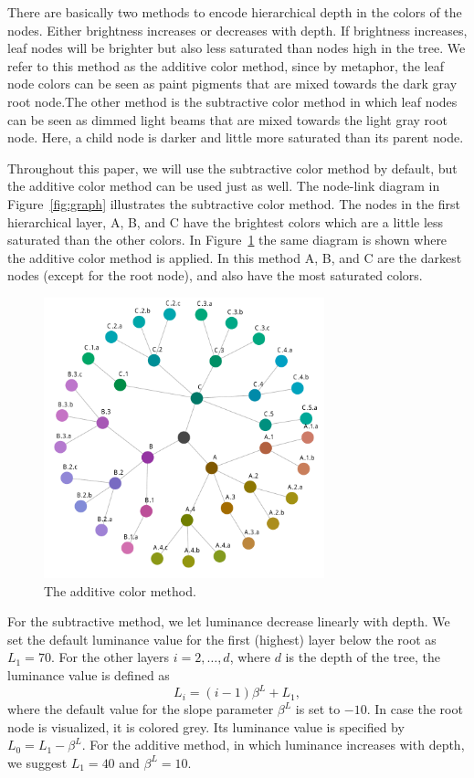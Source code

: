 \documentclass[review,journal]{vgtc}         %
\begin{document}
There are basically two methods to encode hierarchical depth in the colors of the nodes. Either brightness increases or decreases with depth. If brightness increases, leaf nodes will be brighter but also less saturated than nodes high in the tree. We refer to this method as the additive color method, since by metaphor, the leaf node colors can be seen as paint pigments that are mixed towards the dark gray root node.The other method is the subtractive color method in which leaf nodes can be seen as dimmed light beams that are mixed towards the light gray root node. Here, a child node is darker and little more saturated than its parent node.

Throughout this paper, we will use the subtractive color method by default, but the additive color method can be used just as well. The node-link diagram in Figure~\ref{fig:graph} illustrates the subtractive color method. The nodes in the first hierarchical layer, A, B, and C have the brightest colors which are a little less saturated than the other colors. In Figure~\ref{fig:graphadd} the same diagram is shown where the additive color method is applied. In this method A, B, and C are the darkest nodes (except for the root node), and also have the most saturated colors.

\begin{figure}[tb]
  \centering
  \includegraphics[width=3.2in]{HCPgraph3.pdf}
  \caption{The additive color method.}\label{fig:graphadd}
\end{figure}


For the subtractive method, we let luminance decrease linearly with depth. We set the default luminance value for the first (highest) layer below the root as $L_1=70$. For the other layers $i=2,\ldots, d$, where $d$ is the depth of the tree, the luminance value is defined as
\begin{equation}
L_i=(i-1)\beta^L + L_1,
\end{equation}
where the default value for the slope parameter $\beta^L$ is set to $-10$. In case the root node is visualized, it is colored grey. Its luminance value is specified by $L_0=L_1-\beta^L$. For the additive method, in which luminance increases with depth, we suggest $L_1=40$ and $\beta^L=10$. 
\end{document}
